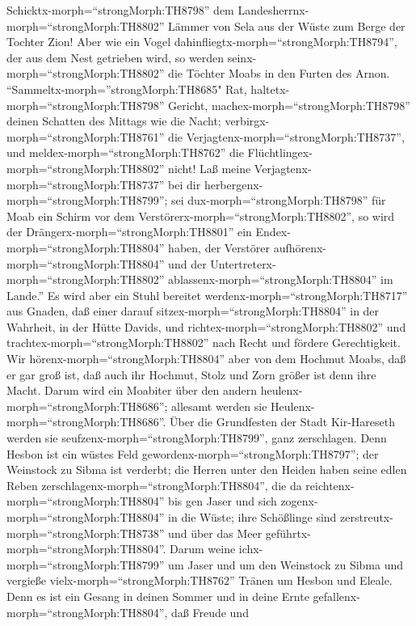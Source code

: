  Schicktx-morph=``strongMorph:TH8798'' dem
Landesherrnx-morph=``strongMorph:TH8802'' Lämmer von Sela aus der Wüste
zum Berge der Tochter Zion!  Aber wie ein Vogel
dahinfliegtx-morph=``strongMorph:TH8794'', der aus dem Nest getrieben
wird, so werden seinx-morph=``strongMorph:TH8802'' die Töchter Moabs in
den Furten des Arnon. 
``Sammeltx-morph=''strongMorph:TH8685" Rat,
haltetx-morph=``strongMorph:TH8798'' Gericht,
machex-morph=``strongMorph:TH8798'' deinen Schatten des Mittags wie die
Nacht; verbirgx-morph=``strongMorph:TH8761'' die
Verjagtenx-morph=``strongMorph:TH8737'', und
meldex-morph=``strongMorph:TH8762'' die
Flüchtlingex-morph=``strongMorph:TH8802'' nicht!  Laß meine
Verjagtenx-morph=``strongMorph:TH8737'' bei dir
herbergenx-morph=``strongMorph:TH8799''; sei
dux-morph=``strongMorph:TH8798'' für Moab ein Schirm vor dem
Verstörerx-morph=``strongMorph:TH8802'', so wird der
Drängerx-morph=``strongMorph:TH8801'' ein
Endex-morph=``strongMorph:TH8804'' haben, der Verstörer
aufhörenx-morph=``strongMorph:TH8804'' und der
Untertreterx-morph=``strongMorph:TH8802''
ablassenx-morph=``strongMorph:TH8804'' im Lande.''  Es wird
aber ein Stuhl bereitet werdenx-morph=``strongMorph:TH8717'' aus Gnaden,
daß einer darauf sitzex-morph=``strongMorph:TH8804'' in der Wahrheit, in
der Hütte Davids, und richtex-morph=``strongMorph:TH8802'' und
trachtex-morph=``strongMorph:TH8802'' nach Recht und fördere
Gerechtigkeit.  Wir hörenx-morph=``strongMorph:TH8804'' aber
von dem Hochmut Moabs, daß er gar groß ist, daß auch ihr Hochmut, Stolz
und Zorn größer ist denn ihre Macht.  Darum wird ein
Moabiter über den andern heulenx-morph=``strongMorph:TH8686''; allesamt
werden sie Heulenx-morph=``strongMorph:TH8686''. Über die Grundfesten
der Stadt Kir-Hareseth werden sie seufzenx-morph=``strongMorph:TH8799'',
ganz zerschlagen.  Denn Hesbon ist ein wüstes Feld
gewordenx-morph=``strongMorph:TH8797''; der Weinstock zu Sibma ist
verderbt; die Herren unter den Heiden haben seine edlen Reben
zerschlagenx-morph=``strongMorph:TH8804'', die da
reichtenx-morph=``strongMorph:TH8804'' bis gen Jaser und sich
zogenx-morph=``strongMorph:TH8804'' in die Wüste; ihre Schößlinge sind
zerstreutx-morph=``strongMorph:TH8738'' und über das Meer
geführtx-morph=``strongMorph:TH8804''.  Darum weine
ichx-morph=``strongMorph:TH8799'' um Jaser und um den Weinstock zu Sibma
und vergieße vielx-morph=``strongMorph:TH8762'' Tränen um Hesbon und
Eleale. Denn es ist ein Gesang in deinen Sommer und in deine Ernte
gefallenx-morph=``strongMorph:TH8804'',  daß Freude und
